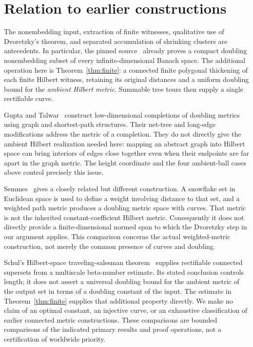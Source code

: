 \documentclass[11pt,a4paper]{article}
\theoremstyle{definition}
\theoremstyle{remark}
\numberwithin{equation}{section}
\begin{document}
\section{Relation to earlier constructions}\label{sec:comparison}
The nonembedding input, extraction of finite witnesses, qualitative use of Dvoretzky's theorem, and separated accumulation of shrinking clusters are antecedents. In particular, the pinned source~\cite{OpenAI} already proves a compact doubling nonembedding subset of every infinite-dimensional Banach space. The additional operation here is Theorem~\ref{thm:finite}: a connected finite polygonal thickening of each finite Hilbert witness, retaining its original distances and a uniform doubling bound for the \emph{ambient Hilbert metric}. Summable tree tours then supply a single rectifiable curve.

Gupta and Talwar~\cite[Theorem~13 and Section~4]{GT} construct low-dimensional completions of doubling metrics using graph and shortest-path structures. Their net-tree and long-edge modifications address the metric of a completion. They do not directly give the ambient Hilbert realization needed here: mapping an abstract graph into Hilbert space can bring interiors of edges close together even when their endpoints are far apart in the graph metric. The height coordinate and the four ambient-ball cases above control precisely this issue.

Semmes~\cite[Section~6, especially Theorem~6.3]{Semmes} gives a closely related but different construction. A snowflake set in Euclidean space is used to define a weight involving distance to that set, and a weighted path metric produces a doubling metric space with curves. That metric is not the inherited constant-coefficient Hilbert metric. Consequently it does not directly provide a finite-dimensional normed span to which the Dvoretzky step in our argument applies. This comparison concerns the actual weighted-metric construction, not merely the common presence of curves and doubling.

Schul's Hilbert-space traveling-salesman theorem~\cite[Theorem~1.5 and Section~4]{Schul} supplies rectifiable connected supersets from a multiscale beta-number estimate. Its stated conclusion controls length; it does not assert a universal doubling bound for the ambient metric of the output set in terms of a doubling constant of the input. The estimate in Theorem~\ref{thm:finite} supplies that additional property directly. We make no claim of an optimal constant, an injective curve, or an exhaustive classification of earlier connected metric constructions. These comparisons are bounded comparisons of the indicated primary results and proof operations, not a certification of worldwide priority.
\end{document}
